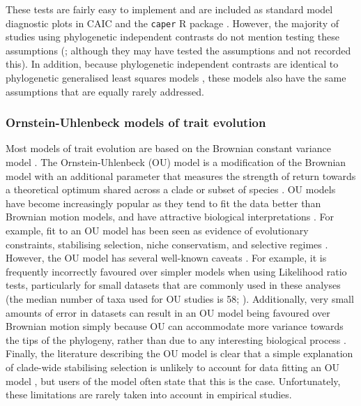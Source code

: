 \documentclass[a4paper,12pt]{article}
\begin{document}
These tests are fairly easy to implement and are included as standard model diagnostic plots in CAIC and the \texttt{caper} R package \citep{purvis1995comparative,Orme:2013aa,R-Core-Team:2014aa}.
However, the majority of studies using phylogenetic independent contrasts do not mention testing these assumptions (\citealp{freckleton2006detecting}; although they may have tested the assumptions and not recorded this).
In addition, because phylogenetic independent contrasts are identical to phylogenetic generalised least squares models \citep{garland2000using,rohle2006comment,blomberg2012independent}, these models also have the same assumptions that are equally rarely addressed. 

\subsubsection{Ornstein-Uhlenbeck models of trait evolution}
Most models of trait evolution are based on the Brownian constant variance model \citep{cavalli1967,felsenstein1973maximum}.
The Ornstein-Uhlenbeck (OU) model is a modification of the Brownian model with an additional parameter that measures the strength of return towards a theoretical optimum shared across a clade or subset of species \citep{hansen1997stabilizing,Butler:2004aa}.
OU models have become increasingly popular as they tend to fit the data better than Brownian motion models, and have attractive biological interpretations \citep{cooper2016}.
For example, fit to an OU model has been seen as evidence of evolutionary constraints, stabilising selection, niche conservatism, and selective regimes \citep{Wiens:2010aa,beaulieu2012modeling,christin2013anatomical,mahler2013exceptional}.
However, the OU model has several well-known caveats \citep[see][]{ives2010phylogenetic,boettiger2012your,hansen2012interpreting,ho2013asymptotic,ho2014intrinsic}. 
For example, it is frequently incorrectly favoured over simpler models when using Likelihood ratio tests, particularly for small datasets that are commonly used in these analyses (the median number of taxa used for OU studies is 58; \citealp{cooper2016}). 
Additionally, very small amounts of error in datasets can result in an OU model being favoured over Brownian motion simply because OU can accommodate more variance towards the tips of the phylogeny, rather than due to any interesting biological process \citep{boettiger2012your,pennell2015model}.
Finally, the literature describing the OU model is clear that a simple explanation of clade-wide stabilising selection is unlikely to account for data fitting an OU model \citep[e.g.][]{hansen1997stabilizing,hansen2005assessing}, but users of the model often state that this is the case.
Unfortunately, these limitations are rarely taken into account in empirical studies.
\end{document}
